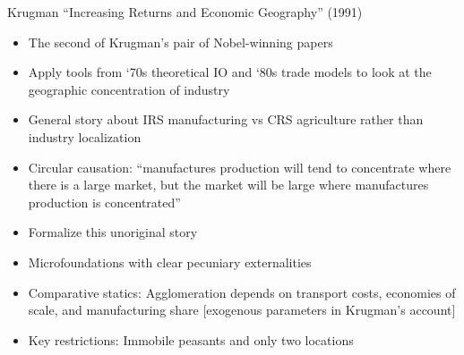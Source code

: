 \documentclass[11pt,notes=hide,aspectratio=169]{beamer}
\begin{document}
\begin{frame}{Krugman ``Increasing Returns and Economic Geography'' (1991)}
\begin{itemize}
	\item The second of Krugman's pair of Nobel-winning papers
	\item Apply tools from `70s theoretical IO and `80s trade models to look at the geographic concentration of industry
	\item General story about IRS manufacturing vs CRS agriculture rather than industry localization
	\item Circular causation: ``manufactures production will tend to concentrate where there is a large market, but the market will be large where manufactures production is concentrated''
	\item Formalize this unoriginal story
	\item Microfoundations with clear pecuniary externalities
	\item Comparative statics: Agglomeration depends on transport costs, economies of scale, and manufacturing share [exogenous parameters in Krugman's account]
	\item Key restrictions: Immobile peasants and only two locations
\end{itemize}
\end{frame}
\end{document}
